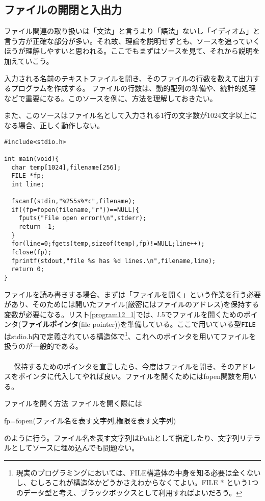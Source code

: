 \subsection{ファイルの開閉と入出力}
ファイル関連の取り扱いは「文法」と言うより「語法」ないし「イディオム」と言う方が正確な部分が多い。それ故、理論を説明せずとも、ソースを追っていくほうが理解しやすいと思われる。ここでもまずはソースを見て、それから説明を加えていこう。
\begin{boxnote}
入力される名前のテキストファイルを開き、そのファイルの行数を数えて出力するプログラムを作成する。
ファイルの行数は、動的配列の準備や、統計的処理などで重要になる。このソースを例に、方法を理解しておきたい。

また、このソースはファイル名として入力される1行の文字数が1024文字以上になる場合、正しく動作しない。
\end{boxnote}
\begin{boxnote}
\begin{lstlisting}[caption=ファイル行数カウント,label=program12_1]
#include<stdio.h>

int main(void){
  char temp[1024],filename[256];
  FILE *fp;
  int line;

  fscanf(stdin,"%255s%*c",filename);
  if((fp=fopen(filename,"r"))==NULL){
    fputs("File open error!\n",stderr);
    return -1;
  }
  for(line=0;fgets(temp,sizeof(temp),fp)!=NULL;line++);
  fclose(fp);
  fprintf(stdout,"file %s has %d lines.\n",filename,line);
  return 0;
}
\end{lstlisting}

\end{boxnote}

ファイルを読み書きする場合、まずは「ファイルを開く」という作業を行う必要があり、そのためには開いたファイル(厳密にはファイルのアドレス)を保持する変数が必要になる。リスト\ref{program12_1}では、$l$.5でファイルを開くためのポインタ(\textbf{ファイルポインタ}(file pointer))を準備している。ここで用いている型\verb|FILE|はstdio.h内で定義されている構造体で\footnote{現実のプログラミングにおいては、FILE構造体の中身を知る必要は全くないし、むしろこれが構造体かどうかさえわからなくてよい。FILE * という1つのデータ型と考え、ブラックボックスとして利用すればよいだろう。}、これへのポインタを用いてファイルを扱うのが一般的である。
\\ \\　
保持するためのポインタを宣言したら、今度はファイルを開き、そのアドレスをポインタに代入してやれば良い。ファイルを開くためにはfopen関数を用いる。
\begin{itembox}[l]{ファイルを開く方法}
ファイルを開く際には
\begin{code}
fp=fopen(ファイル名を表す文字列,権限を表す文字列)
\end{code}
のように行う。ファイル名を表す文字列はPathとして指定したり、文字列リテラルとしてソースに埋め込んでも問題ない。
\end{itembox}

